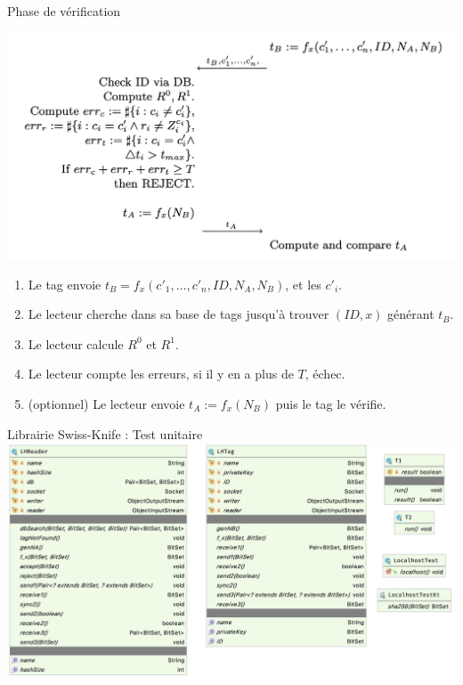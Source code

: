 \documentclass[aspectratio=169]{beamer}
\begin{document}
\begin{frame}{Phase de vérification}
  \begin{multicols}{2}
    \begin{minipage}[c]{\linewidth}
      \centering
      \bigskip
      \bigskip
      \bigskip
      \includegraphics[width=\linewidth]{../assets/sk-phase3}
    \end{minipage}

    \begin{minipage}[t]{\linewidth}
      \begin{enumerate}
        \item Le tag envoie $t_B = f_x(c'_1, \hdots, c'_n, ID, N_A, N_B)$, et les $c'_i$.
        \item Le lecteur cherche dans sa base de tags jusqu'à trouver $(ID, x)$ générant $t_B$.
        \item Le lecteur calcule $R^0$ et $R^1$.
        \item Le lecteur compte les erreurs, si il y en a plus de $T$, échec.
        \item (optionnel) Le lecteur envoie $t_A := f_x(N_B)$ puis le tag le vérifie.
      \end{enumerate}
    \end{minipage}
  \end{multicols}
\end{frame}

\begin{frame}{Librairie Swiss-Knife : Test unitaire}
  \centering
  \includegraphics[height=.9\textheight]{../assets/uml_test_detail}
\end{frame}
\end{document}
